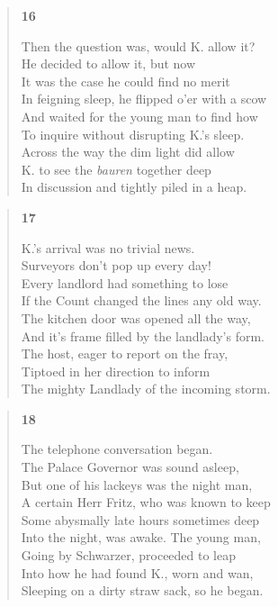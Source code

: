 \documentclass{article}
\begin{document}
\newpage
\begin{verse}
  \begin{center}
    \textbf{16} \\
  \end{center}
  Then the question was, would K. allow it? \\
  He decided to allow it, but now \\
  It was the case he could find no merit \\
  In feigning sleep, he flipped o'er with a scow \\
  And waited for the young man to find how \\
  To inquire without disrupting K.'s sleep. \\
  Across the way the dim light did allow \\
  K. to see the \textit{bauren} together deep \\
  In discussion and tightly piled in a heap.
\end{verse}
\begin{verse}
  \begin{center}
    \textbf{17} \\
  \end{center}
  K.'s arrival was no trivial news. \\
  Surveyors don't pop up every day! \\
  Every landlord had something to lose \\
  If the Count changed the lines any old way. \\
  The kitchen door was opened all the way, \\
  And it's frame filled by the landlady's form. \\
  The host, eager to report on the fray, \\
  Tiptoed in her direction to inform \\
  The mighty Landlady of the incoming storm.
\end{verse}
\begin{verse}
  \begin{center}
    \textbf{18} \\
  \end{center}
  The telephone conversation began. \\
  The Palace Governor was sound asleep, \\
  But one of his lackeys was the night man, \\
  A certain Herr Fritz, who was known to keep \\
  Some abysmally late hours sometimes deep \\
  Into the night, was awake. The young man, \\
  Going by Schwarzer, proceeded to leap \\
  Into how he had found K., worn and wan, \\
  Sleeping on a dirty straw sack, so he began.
\end{verse}
\end{document}
